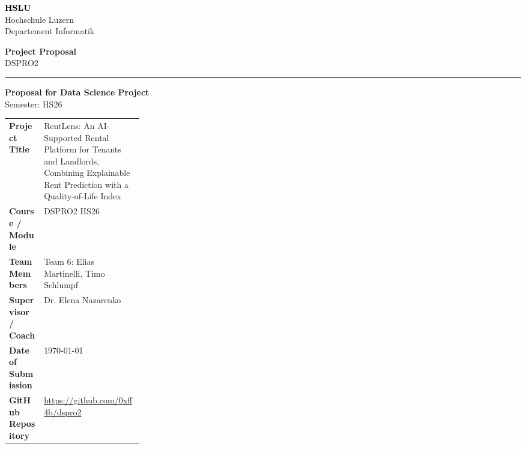 \documentclass[11pt,a4paper]{article}
\newcommand{\hsluwordmark}{%
  {\fontsize{22}{24}\selectfont\bfseries\textcolor{black}{HSLU}}%
}
\newcommand{\proposaltype}{%
  {\fontsize{13}{15}\selectfont\bfseries Project Proposal}
}
\newcommand{\moduleline}{%
  {\fontsize{11}{13}\selectfont DSPRO2}
}
\begin{document}
\begin{minipage}[t]{0.62\textwidth}
    \hsluwordmark\\[-1mm]
    {\small\color{hsluGray}Hochschule Luzern}\\[-0.5mm]
    {\small\color{hsluGray}Departement Informatik}
\end{minipage}
\hfill
\begin{minipage}[t]{0.35\textwidth}
    \raggedleft
    \proposaltype\\[1mm]
    \moduleline
\end{minipage}

\vspace{8mm}
{\color{hsluGray}\rule{\textwidth}{1.2pt}}

\vspace{8mm}

\begin{center}
    {\LARGE\bfseries\color{hsluDark}Proposal for Data Science Project}\\[1mm]
    {\large\color{hsluGray}Semester: HS26}
\end{center}

\vspace{8mm}

\colorbox{boxGray}{%
\parbox{\dimexpr\linewidth-2\fboxsep\relax}{
\vspace{1mm}
\renewcommand{\arraystretch}{1.35}
\begin{tabularx}{\linewidth}{>{\bfseries}p{0.26\linewidth} X}
Project Title & RentLens: An AI-Supported Rental Platform for Tenants and Landlords, Combining Explainable Rent Prediction with a Quality-of-Life Index \\
Course / Module & DSPRO2 HS26 \\
Team Members & Team 6: Elias Martinelli, Timo Schlumpf \\
Supervisor / Coach & Dr. Elena Nazarenko \\
Date of Submission & \today \\
GitHub Repository & \url{https://github.com/0xff4b/dspro2} \\
\end{tabularx}
\vspace{1mm}
}
}

\vspace{1em}

\end{document}
